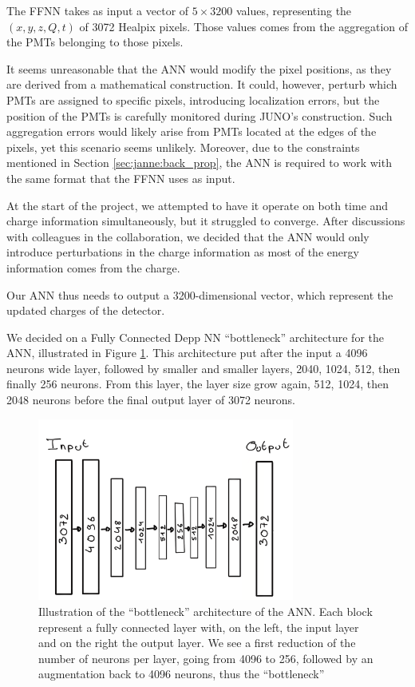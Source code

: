 \documentclass[../main.tex]{subfiles}
\begin{document}
The FFNN takes as input a vector of $5 \times 3200$ values, representing the $(x, y, z, Q, t)$ of 3072 Healpix pixels. Those values comes from the aggregation of the PMTs belonging to those pixels.

It seems unreasonable that the ANN would modify the pixel positions, as they are derived from a mathematical construction. It could, however, perturb which PMTs are assigned to specific pixels, introducing localization errors, but the position of the PMTs is carefully monitored during JUNO’s construction. Such aggregation errors would likely arise from PMTs located at the edges of the pixels, yet this scenario seems unlikely. Moreover, due to the constraints mentioned in Section \ref{sec:janne:back_prop}, the ANN is required to work with the same format that the FFNN uses as input.

At the start of the project, we attempted to have it operate on both time and charge information simultaneously, but it struggled to converge. After discussions with colleagues in the collaboration, we decided that the ANN would only introduce perturbations in the charge information as most of the energy information comes from the charge.

Our ANN thus needs to output a 3200-dimensional vector, which represent the updated charges of the detector.

We decided on a Fully Connected Depp NN ``bottleneck'' architecture for the ANN, illustrated in Figure \ref{fig:janne:ann_arch}. This architecture put after the input a 4096 neurons wide layer, followed by smaller and smaller layers, 2040, 1024, 512, then finally 256 neurons. From this layer, the layer size grow again, 512, 1024, then 2048 neurons before the final output layer of 3072 neurons.

\begin{figure}
  \centering
  \includegraphics[height=6cm]{images/janne/ANN_illustration.png}
  \caption{Illustration of the ``bottleneck'' architecture of the ANN. Each block represent a fully connected layer with, on the left, the input layer and on the right the output layer. We see a first reduction of the number of neurons per layer, going from 4096 to 256, followed by an augmentation back to 4096 neurons, thus the ``bottleneck''}
  \label{fig:janne:ann_arch}
\end{figure}
\end{document}
